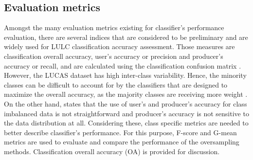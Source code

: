 \documentclass[parskip=full]{scrartcl}
\begin{document}
\subsection{Evaluation metrics} \label{evaluation methods}

Amongst the many evaluation metrics existing for classifier's performance
evaluation, there are several indices that are considered to be preliminary and
are widely used for LULC classification accuracy assessment. Those measures are
classification overall accuracy, user's accuracy or precision and producer's
accuracy or recall,  and are calculated using the classification confusion
matrix \cite{Liu2007}. However, the LUCAS dataset has high inter-class
variability. Hence, the minority classes can be difficult to account for by the
classifiers that are designed to maximize the overall accuracy, as the majority
classes are receiving more weight \cite{Inglada2017}. On the other hand,
\cite{He2008} states that the use of user's and producer's accuracy for class
imbalanced data is not straightforward and producer's accuracy is not sensitive
to the data distribution at all. Considering these, class specific metrics are
needed to better describe classifier's performance. For this purpose, F-score
and G-mean metrics are used to evaluate and compare the performance of the
oversampling methods. Classification overall accuracy (OA) is provided for
discussion.
\end{document}

